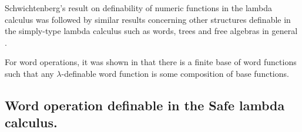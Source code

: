 Schwichtenberg's result on definability of numeric functions in the
lambda calculus was followed by similar results concerning other
structures definable in the simply-type lambda calculus such as
words, trees and free algebras in general
\cite{DBLP:journals/tcs/Leivant93,DBLP:journals/apal/Zaionc91,702481,DBLP:journals/tcs/Zaionc87}.

For word operations, it was shown in
\cite{DBLP:journals/tcs/Zaionc87} that there is a finite base of
word functions such that any $\lambda$-definable word function is
some composition of base functions.


\subsection{Word operation definable in the Safe lambda calculus.}
